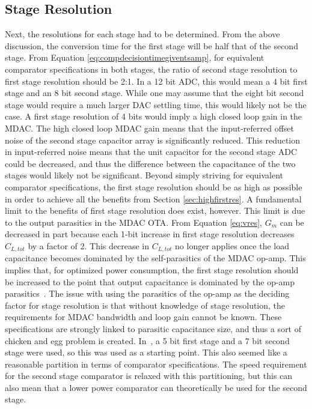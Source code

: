\subsection{Stage Resolution}
Next, the resolutions for each stage had to be determined. From the above discussion, the conversion time for the first stage will be half that of the second stage. From Equation \ref{eq:compdecisiontimegiventsamp}, for equivalent comparator specifications in both stages, the ratio of second stage resolution to first stage resolution should be 2:1. In a 12 bit ADC, this would mean a 4 bit first stage and an 8 bit second stage. While one may assume that the eight bit second stage would require a much larger DAC settling time, this would likely not be the case. A first stage resolution of 4 bits would imply a high closed loop gain in the MDAC. The high closed loop MDAC gain means that the input-referred offset noise of the second stage capacitor array is significantly reduced. This reduction in input-referred noise means that the unit capacitor for the second stage ADC could be decreased, and thus the difference between the capacitance of the two stages would likely not be significant. Beyond simply striving for equivalent comparator specifications, the first stage resolution should be as high as possible in order to achieve all the benefits from Section \ref{sec:highfirstres}. A fundamental limit to the benefits of first stage resolution does exist, however. This limit is due to the output parasitics in the MDAC OTA. From Equation \ref{eq:vres}, $G_m$ can be decreased in part because each 1-bit increase in first stage resolution decreases $C_{L,tot}$ by a factor of 2. This decrease in $C_{L,tot}$ no longer applies once the load capacitance becomes dominated by the self-parasitics of the MDAC op-amp. This implies that, for optimized power consumption, the first stage resolution should be increased to the point that output capacitance is dominated by the op-amp parasitics~\cite{5714725}. The issue with using the parasitics of the op-amp as the deciding factor for stage resolution is that without knowledge of stage resolution, the requirements for MDAC bandwidth and loop gain cannot be known. These specifications are strongly linked to parasitic capacitance size, and thus a sort of chicken and egg problem is created. In~\cite{5714725}, a 5 bit first stage and a 7 bit second stage were used, so this was used as a starting point. This also seemed like a reasonable partition in terms of comparator specifications. The speed requirement for the second stage comparator is relaxed with this partitioning, but this can also mean that a lower power comparator can theoretically be used for the second stage.
